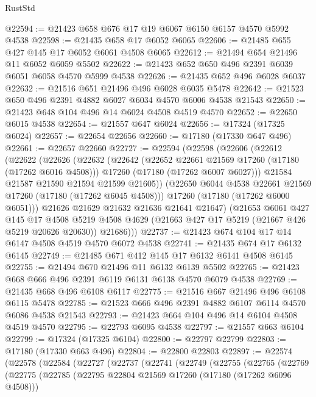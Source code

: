\begin{lexlean}{RustStd}
\begin{coremodule}
@22594 := @21423 @658 @676 @17 @19 @6067 @6150 @6157 @4570 @5992 @4538
@22598 := @21435 @658 @17 @6052 @6065
@22606 := @21485 @655 @427 @145 @17 @6052 @6061 @4508 @6065
@22612 := @21494 @654 @21496 @11 @6052 @6059 @5502
@22622 := @21423 @652 @650 @496 @2391 @6039 @6051 @6058 @4570 @5999 @4538
@22626 := @21435 @652 @496 @6028 @6037
@22632 := @21516 @651 @21496 @496 @6028 @6035 @5478
@22642 := @21523 @650 @496 @2391 @4882 @6027 @6034 @4570 @6006 @4538 @21543
@22650 := @21423 @648 @104 @496 @14 @6024 @4508 @4519 @4570
@22652 := @22650 @6015 @4538
@22654 := @21557 @647 @6024
@22656 := @17324 (@17325 @6024)
@22657 := @22654 @22656
@22660 := @17180 (@17330 @647 @496)
@22661 := @22657 @22660
@22727 := @22594
    (@22598
      (@22606
        (@22612
          (@22622
            (@22626
              (@22632
                (@22642
                  (@22652 @22661 @21569 @17260 (@17180 (@17262 @6016 @4508)))
                  @17260
                  (@17180 (@17262 @6007 @6027)))
                @21584
                @21587
                @21590
                @21594
                @21599
                @21605))
            (@22650 @6044 @4538 @22661 @21569 @17260 (@17180 (@17262 @6045 @4508)))
            @17260
            (@17180 (@17262 @6000 @6051)))
          @21626
          @21629
          @21632
          @21636
          @21641
          @21647)
        (@21653
          @6061
          @427
          @145
          @17
          @4508
          @5219
          @4508
          @4629
          (@21663 @427 @17 @5219 (@21667 @426 @5219 @20626 @20630))
          @21686)))
@22737 := @21423 @674 @104 @17 @14 @6147 @4508 @4519 @4570 @6072 @4538
@22741 := @21435 @674 @17 @6132 @6145
@22749 := @21485 @671 @412 @145 @17 @6132 @6141 @4508 @6145
@22755 := @21494 @670 @21496 @11 @6132 @6139 @5502
@22765 := @21423 @668 @666 @496 @2391 @6119 @6131 @6138 @4570 @6079 @4538
@22769 := @21435 @668 @496 @6108 @6117
@22775 := @21516 @667 @21496 @496 @6108 @6115 @5478
@22785 := @21523 @666 @496 @2391 @4882 @6107 @6114 @4570 @6086 @4538 @21543
@22793 := @21423 @664 @104 @496 @14 @6104 @4508 @4519 @4570
@22795 := @22793 @6095 @4538
@22797 := @21557 @663 @6104
@22799 := @17324 (@17325 @6104)
@22800 := @22797 @22799
@22803 := @17180 (@17330 @663 @496)
@22804 := @22800 @22803
@22897 := @22574
    (@22578
      (@22584
        (@22727
          (@22737
            (@22741
              (@22749
                (@22755
                  (@22765
                    (@22769
                      (@22775
                        (@22785
                          (@22795 @22804 @21569 @17260 (@17180 (@17262 @6096 @4508)))

\end{coremodule}
\end{lexlean}
